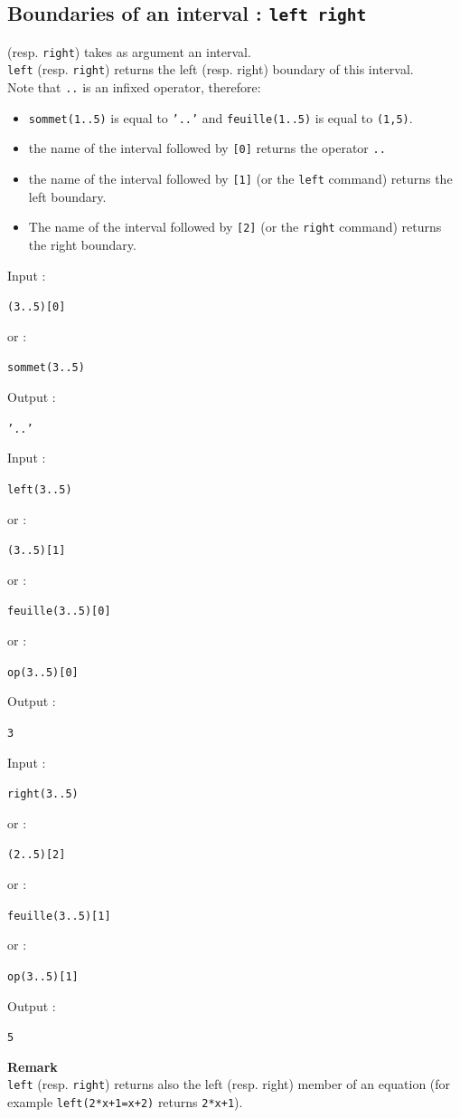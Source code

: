 \documentclass[a4paper,11pt]{book}
\begin{document}
\subsection{Boundaries of an interval : {\tt left right}}\index{[]} 
 (resp. {\tt right}) takes as argument an interval.\\
{\tt left} (resp. {\tt right}) returns the left (resp. right) boundary
of this interval. \\
Note that {\tt ..} is an  infixed operator, therefore:
\begin{itemize}
\item {\tt sommet(1..5)} is equal to {\tt '..'} and {\tt feuille(1..5)}
 is equal to {\tt (1,5)}.
\item the name of the interval followed by 
{\tt [0]} returns the operator {\tt ..}
\item 
the name of the interval followed by {\tt [1]} 
(or the {\tt left} command)  returns the left boundary.
\item
The name of the interval followed by {\tt [2]} 
(or the {\tt right} command) 
returns the right boundary.
\end{itemize}
Input :
\begin{center}{\tt (3..5)[0]}\end{center}
or :
\begin{center}{\tt sommet(3..5)}\end{center}
Output :
\begin{center}{\tt '..'}\end{center}
Input :
\begin{center}{\tt left(3..5)}\end{center}
or :
\begin{center}{\tt (3..5)[1]}\end{center}
or :
\begin{center}{\tt feuille(3..5)[0]}\end{center}
or :
\begin{center}{\tt op(3..5)[0]}\end{center}
Output :
\begin{center}{\tt 3}\end{center}
Input :
\begin{center}{\tt right(3..5)}\end{center}
or :
\begin{center}{\tt (2..5)[2]}\end{center}
or :
\begin{center}{\tt feuille(3..5)[1]}\end{center}
or :
\begin{center}{\tt op(3..5)[1]}\end{center}
Output :
\begin{center}{\tt 5}\end{center}
{\bf Remark}\\
{\tt left} (resp. {\tt right}) returns also the left (resp. right) member of an 
equation (for example {\tt left(2*x+1=x+2)} returns {\tt 2*x+1}).
\end{document}
